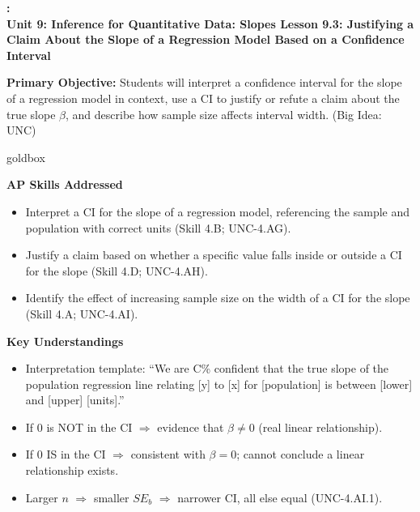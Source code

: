 \documentclass[10pt]{article}
\newcommand{\UnitNumberName}{Unit 9: Inference for Quantitative Data: Slopes \quad}
\newcommand{\LessonNumberName}{Lesson 9.3: Justifying a Claim About the Slope of a Regression Model Based on a Confidence Interval}
\begin{document}
\begin{center}
    {\Large\bfseries \CourseName: \SchoolYear \\
    {\small\bfseries \UnitNumberName \LessonNumberName}}
\end{center}

\begin{tcolorbox}[colback=sky, colframe=navy, boxrule=0.9pt, arc=2mm,
    left=2mm, right=2mm, top=1.5mm, bottom=1.5mm]
    \textbf{Primary Objective:} Students will interpret a confidence interval for the slope
    of a regression model in context, use a CI to justify or refute a claim about the true slope
    $\beta$, and describe how sample size affects interval width. (Big Idea: UNC)
\end{tcolorbox}

\renewcommand{\arraystretch}{1.6}
\begin{skillbox}{goldbox}
\begin{minipage}[t]{0.48\linewidth}
    \textbf{AP Skills Addressed}
    \begin{itemize}
        \item Interpret a CI for the slope of a regression model, referencing the sample and
              population with correct units (Skill 4.B; UNC-4.AG).
        \item Justify a claim based on whether a specific value falls inside or outside a CI
              for the slope (Skill 4.D; UNC-4.AH).
        \item Identify the effect of increasing sample size on the width of a CI for the slope
              (Skill 4.A; UNC-4.AI).
    \end{itemize}
\end{minipage}
\hfill
\begin{minipage}[t]{0.48\linewidth}
    \textbf{Key Understandings}
    \begin{itemize}
        \item Interpretation template: ``We are C\% confident that the true slope of the
              population regression line relating [y] to [x] for [population] is between
              [lower] and [upper] [units].''
        \item If 0 is NOT in the CI $\Rightarrow$ evidence that $\beta \ne 0$ (real linear
              relationship).
        \item If 0 IS in the CI $\Rightarrow$ consistent with $\beta = 0$; cannot conclude
              a linear relationship exists.
        \item Larger $n$ $\Rightarrow$ smaller $SE_b$ $\Rightarrow$ narrower CI, all else equal
              (UNC-4.AI.1).
    \end{itemize}
\end{minipage}
\end{skillbox}
\end{document}
